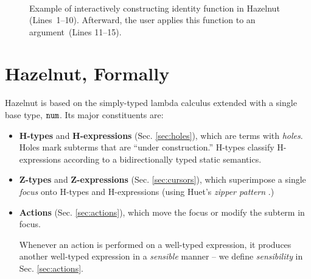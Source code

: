 \documentclass{llncs}
\begin{document}
\begin{figure}[t]
\[\begin{array}{|c||c|c||l|l|}
\end{array}
\]
\caption{Example of interactively constructing identity function in Hazelnut (Lines~1--10).
  Afterward, the user applies this function to an argument~(Lines 11--15).}
\label{fig:first-example}
\end{figure}

\section{Hazelnut, Formally}
\label{sec:hazel}
Hazelnut is based on the simply-typed lambda calculus extended with a single base type, $\texttt{num}$. Its major constituents are:
\begin{itemize}
\item \textbf{H-types} and \textbf{H-expressions} (Sec. \ref{sec:holes}), which are terms with \emph{holes}. Holes mark subterms that are ``under construction.'' H-types classify H-expressions according to a {bidirectionally typed} static semantics.
\item \textbf{Z-types} and \textbf{Z-expressions} (Sec. \ref{sec:cursors}), which superimpose a single \emph{focus} onto H-types and H-expressions (using Huet's \emph{zipper pattern} \cite{JFP::Huet1997}.)
\item \textbf{Actions} (Sec. \ref{sec:actions}), which move the focus or modify the subterm in focus.

Whenever an action is performed on a well-typed expression, it produces another well-typed expression in a \emph{sensible} manner -- we define \emph{sensibility} in Sec. \ref{sec:actions}.
\end{itemize}
\end{document}
